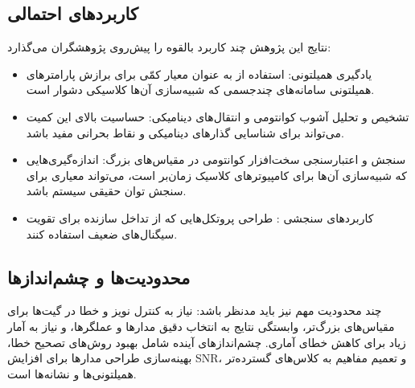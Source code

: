 \subsection*{کاربردهای احتمالی}
نتایج این پژوهش چند کاربرد بالقوه را پیش‌روی پژوهشگران می‌گذارد:
\begin{itemize}
  \item یادگیری همیلتونی: استفاده از  به عنوان معیار کمّی برای برازش پارامترهای همیلتونی سامانه‌های چندجسمی که شبیه‌سازی آن‌ها کلاسیکی دشوار است.
  \item تشخیص و تحلیل آشوب کوانتومی و انتقال‌های دینامیکی: حساسیت بالای این کمیت می‌تواند برای شناسایی گذارهای دینامیکی و نقاط بحرانی مفید باشد.
  \item سنجش و اعتبارسنجی سخت‌افزار کوانتومی در مقیاس‌های بزرگ: اندازه‌گیری‌هایی که شبیه‌سازی آن‌ها برای کامپیوترهای کلاسیک زمان‌بر است، می‌تواند معیاری برای سنجش توان حقیقی سیستم باشد.
  \item کاربردهای سنجشی  : طراحی پروتکل‌هایی که از تداخل سازنده برای تقویت سیگنال‌های ضعیف استفاده کنند.
\end{itemize}

\subsection*{محدودیت‌ها و چشم‌اندازها}
چند محدودیت مهم نیز باید مدنظر باشد: نیاز به کنترل نویز و خطا در گیت‌ها برای مقیاس‌های بزرگ‌تر، وابستگی نتایج به انتخاب دقیق مدارها و عملگرها، و نیاز به آمار زیاد برای کاهش خطای آماری. چشم‌اندازهای آینده شامل بهبود روش‌های تصحیح خطا، بهینه‌سازی طراحی مدارها برای افزایش SNR، و تعمیم مفاهیم به کلاس‌های گسترده‌تر همیلتونی‌ها و نشانه‌ها است.
